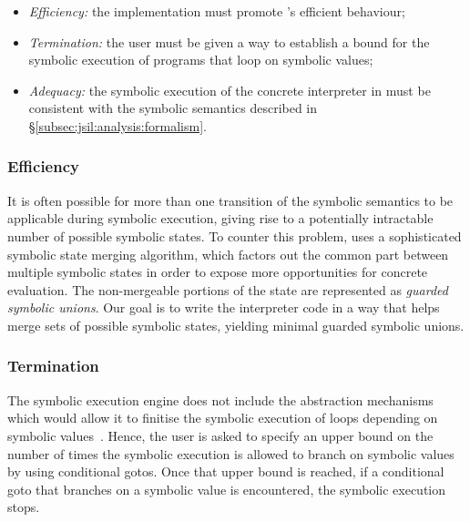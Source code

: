 \begin{itemize}          
   \item \emph{Efficiency:} the implementation must promote \rosette's efficient behaviour;
   
   \item \emph{Termination:} the user must be given a way to establish a bound for the symbolic execution 
            of programs that loop on symbolic values; 
  
   \item \emph{Adequacy:} the symbolic execution of the concrete interpreter in \rosette 
            must be consistent with the symbolic semantics described in \S\ref{subsec:jsil:analysis:formalism}. 
\end{itemize}

\subsubsection{Efficiency}
It is often possible for more than one transition of the symbolic 
semantics to be applicable during symbolic execution, 
giving rise to a potentially intractable number of possible symbolic states. 
To counter this problem, \rosette uses a sophisticated 
symbolic state merging algorithm, which factors out the common 
part between multiple symbolic states  in order to expose more 
opportunities for concrete evaluation. The non-mergeable portions of the state 
are represented as \emph{guarded symbolic unions}. 
Our goal is to write the interpreter code in a way that helps 
\rosette merge sets of possible symbolic states, yielding minimal 
guarded symbolic unions.

\subsubsection{Termination} The \jsil symbolic execution engine does not 
include the abstraction mechanisms which would allow it to finitise the symbolic 
execution of loops depending on symbolic values~\cite{abstract:symbolic:exec}. 
Hence, the user is asked to specify an upper bound on the number of times
the symbolic execution is allowed to branch on symbolic values by using
conditional gotos. 
Once that upper bound is reached, if a conditional goto that branches 
on a symbolic value is encountered, the symbolic execution stops.  





